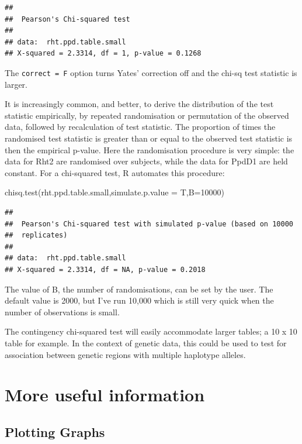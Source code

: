 \documentclass[
]{book}
\newenvironment{Shaded}{\begin{snugshade}}{\end{snugshade}}
\newcommand{\AttributeTok}[1]{\textcolor[rgb]{0.77,0.63,0.00}{#1}}
\newcommand{\DecValTok}[1]{\textcolor[rgb]{0.00,0.00,0.81}{#1}}
\newcommand{\FunctionTok}[1]{\textcolor[rgb]{0.00,0.00,0.00}{#1}}
\newcommand{\NormalTok}[1]{#1}
\begin{document}
\begin{verbatim}
## 
##  Pearson's Chi-squared test
## 
## data:  rht.ppd.table.small
## X-squared = 2.3314, df = 1, p-value = 0.1268
\end{verbatim}

The \texttt{correct\ =\ F} option turns Yates' correction off and the chi-sq test statistic is larger.

It is increasingly common, and better, to derive the distribution of the test statistic empirically, by repeated randomisation or permutation of the observed data, followed by recalculation of test statistic. The proportion of times the randomised test statistic is greater than or equal to the observed test statistic is then the empirical p-value. Here the randomisation procedure is very simple: the data for Rht2 are randomised over subjects, while the data for PpdD1 are held constant. For a chi-squared test, R automates this procedure:

\begin{Shaded}
\begin{Highlighting}[]
\FunctionTok{chisq.test}\NormalTok{(rht.ppd.table.small,}\AttributeTok{simulate.p.value =}\NormalTok{ T,}\AttributeTok{B=}\DecValTok{10000}\NormalTok{)}
\end{Highlighting}
\end{Shaded}

\begin{verbatim}
## 
##  Pearson's Chi-squared test with simulated p-value (based on 10000
##  replicates)
## 
## data:  rht.ppd.table.small
## X-squared = 2.3314, df = NA, p-value = 0.2018
\end{verbatim}

The value of B, the number of randomisations, can be set by the user. The default value is 2000, but I've run 10,000 which is still very quick when the number of observations is small.

The contingency chi-squared test will easily accommodate larger tables; a 10 x 10 table for example. In the context of genetic data, this could be used to test for association between genetic regions with multiple haplotype alleles.

\hypertarget{more-useful-information}{%
\section{More useful information}\label{more-useful-information}}

\hypertarget{plotting-graphs}{%
\subsection{Plotting Graphs}\label{plotting-graphs}}
\end{document}

